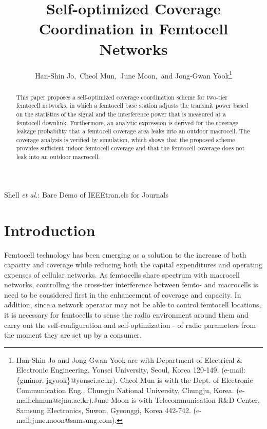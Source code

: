 \documentclass[draftclsnofoot,12pt,onecolumn]{IEEEtran}
\begin{document}
\title{Self-optimized Coverage Coordination in Femtocell Networks}

\author{Han-Shin Jo,~Cheol Mun,~June Moon,~and Jong-Gwan Yook\thanks{Han-Shin Jo and Jong-Gwan Yook are with Department of Electrical \& Electronic Engineering, Yonsei University,
        Seoul, Korea 120-149. (e-mail: \{gminor, jgyook\}@yonsei.ac.kr).
Cheol Mun is with the Dept. of Electronic Communication
Eng., Chungju National University, Chungju, Korea.
(e-mail:chmun@cjnu.ac.kr).June Moon is with Telecommunication R\&D Center, Samsung Electronics, Suwon, Gyeonggi, Korea
442-742. (e-mail:june.moon@samsung.com).}}

\markboth{} {Shell \MakeLowercase{\textit{et al.}}: Bare Demo of
IEEEtran.cls for Journals} \maketitle
\begin{abstract}
This paper proposes a self-optimized coverage coordination scheme
for two-tier femtocell networks, in which a femtocell base station
adjusts the transmit power based on the statistics of the signal and
the interference power that is measured at a femtocell downlink.
Furthermore, an analytic expression is derived for the coverage
leakage probability that a femtocell coverage area leaks into an
outdoor macrocell. The coverage analysis is verified by simulation,
which shows that the proposed scheme provides sufficient indoor
femtocell coverage and that the femtocell coverage does not leak
into an outdoor macrocell.
\end{abstract}

\IEEEpeerreviewmaketitle

\section{Introduction}
Femtocell technology has been emerging as a solution to the increase
of both capacity and coverage while reducing both the capital
expenditures and operating expenses of cellular networks.
As femtocells share spectrum with macrocell networks, controlling
the cross-tier interference between femto- and macrocells is need to
be considered first in the enhancement of coverage and capacity. In
addition, since a network operator may not be able to control
femtocell locations, it is necessary for femtocells to sense the
radio environment around them and carry out the self-configuration
and self-optimization \cite{SOC1}-\cite{SOC3} of radio parameters
from the moment they are set up by a consumer.
\end{document}
